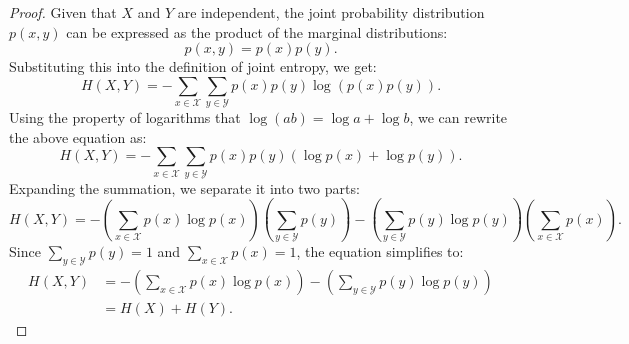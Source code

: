 \documentclass[12pt]{article}
\begin{document}
		\begin{proof}
			Given that \(X\) and \(Y\) are independent, the joint probability distribution \(p(x, y)\) can be expressed as the product of the marginal distributions:
			\begin{equation}
				p(x, y) = p(x)p(y).
			\end{equation}
			Substituting this into the definition of joint entropy, we get:
			\begin{equation}
				H(X, Y) = -\sum_{x \in \mathcal{X}} \sum_{y \in \mathcal{Y}} p(x)p(y) \log (p(x)p(y)).
			\end{equation}
			Using the property of logarithms that \(\log(ab) = \log a + \log b\), we can rewrite the above equation as:
			\begin{equation}
				H(X, Y) = -\sum_{x \in \mathcal{X}} \sum_{y \in \mathcal{Y}} p(x)p(y) (\log p(x) + \log p(y)).
			\end{equation}
			Expanding the summation, we separate it into two parts:
			\begin{equation}
				H(X, Y) = -\left(\sum_{x \in \mathcal{X}} p(x) \log p(x)\right) \left(\sum_{y \in \mathcal{Y}} p(y)\right) - \left(\sum_{y \in \mathcal{Y}} p(y) \log p(y)\right) \left(\sum_{x \in \mathcal{X}} p(x)\right).
			\end{equation}
			Since \(\sum_{y \in \mathcal{Y}} p(y) = 1\) and \(\sum_{x \in \mathcal{X}} p(x) = 1\), the equation simplifies to:
			\begin{equation}
				\begin{split}
					H(X, Y) & =  -\left(\sum_{x \in \mathcal{X}} p(x) \log p(x)\right) - \left(\sum_{y \in \mathcal{Y}} p(y) \log p(y)\right) \\
					& = H(X) + H(Y). 
				\end{split}
			\end{equation}
		\end{proof}
		
		
		
\end{document}
